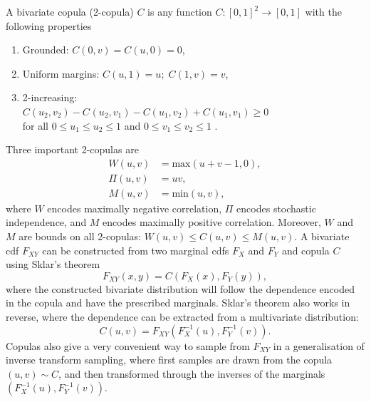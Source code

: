 \documentclass{juliacon}
\begin{document}
A bivariate copula (2-copula) $C$ is any function $C:[0,1]^2 \rightarrow [0,  1]$ with the following properties
\begin{enumerate}
  \item Grounded: $C(0,v) = C(u,0) = 0$,
  \item Uniform margins: $C(u,1) = u; \;C(1,v) = v$,
  \item 2-increasing: \\ $C(u_{2},v_{2}) - C_{}(u_{2}, v_{1}) - C(u_{1}, v_{2}) + C(u_{1}, v_{1}) \ge 0$\\ for all $0 \le u_{1} \le u_{2} \le 1$ and $0 \le v_{1} \le v_{2} \le 1$ .
\end{enumerate}
\noindent Three important 2-copulas are
\begin{align*}
  W(u,v) &= \mathrm{max}( u + v-1,0),  \\
  \Pi(u,v) &= uv, \\
  M(u,v) &= \mathrm{min}(u,v),
\end{align*}
\noindent where $W$ encodes maximally negative correlation, $\Pi$ encodes stochastic independence, and $M$ encodes maximally positive correlation. Moreover, $W$ and $M$ are bounds on all 2-copulas: $W(u,v) \leq C(u,v) \leq M(u,v)$. A bivariate cdf $F_{XY}$ can be constructed from two marginal cdfs $F_{X}$ and $F_{Y}$ and copula $C$ using Sklar's theorem
\begin{equation*}
  F_{XY}(x,y) = C(F_{X}(x), F_{Y}(y)),
\end{equation*}
\noindent where the constructed bivariate distribution will follow the dependence encoded in the copula and have the prescribed marginals. Sklar's theorem also works in reverse, where the dependence can be extracted from a multivariate distribution: 
\begin{equation*}
  C(u,v) = F_{XY}(F^{-1}_{X}(u), F^{-1}_{Y}(v)).
\end{equation*}
\noindent Copulas also give a very convenient way to sample from $F_{XY}$ in a generalisation of inverse transform sampling, where first samples are drawn from the copula $(u,v) \sim C$, and then transformed through the inverses of the marginals $(F^{-1}_{X}(u), F^{-1}_{Y}(v))$.
\end{document}
